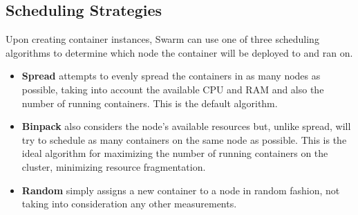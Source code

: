 \documentclass{article}
\begin{document}
\subsection{Scheduling Strategies}
Upon creating container instances, Swarm can use one of three scheduling algorithms to determine which node the container will be deployed to and ran on.
\begin{itemize}
\item \textbf{Spread} attempts to evenly spread the containers in as many nodes as possible, taking into account the available CPU and RAM and also the number of running containers. This is the default algorithm.
\item \textbf{Binpack} also considers the node's available resources but, unlike spread, will try to schedule as many containers on the same node as possible. This is the ideal algorithm for maximizing the number of running containers on the cluster, minimizing resource fragmentation.
\item \textbf{Random} simply assigns a new container to a node in random fashion, not taking into consideration any other measurements.
\end{itemize}
\end{document}

